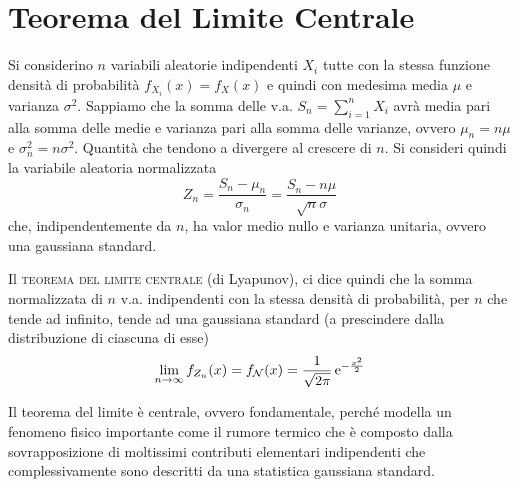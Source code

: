 \section{Teorema del Limite Centrale}
Si considerino $n$ variabili aleatorie indipendenti $X_i$ tutte con la stessa funzione densità di probabilità $f_{X_i}(x)=f_X(x)$ e quindi con medesima media $\mu$ e varianza $\sigma^2$. Sappiamo che la somma delle v.a. $S_n=\sum_{i=1}^{n}X_i$ avrà media pari alla somma delle medie e varianza pari alla somma delle varianze, ovvero $\mu_n=n\mu$ e $\sigma^2_n=n\sigma^2$. Quantità che tendono a divergere al crescere di $n$.
Si consideri quindi la variabile aleatoria normalizzata
\[
	Z_n=\frac{S_n-\mu_n}{\sigma_n}=\frac{S_n-n\mu}{\sqrt{n}\sigma}
\]
che, indipendentemente da $n$, ha valor medio nullo e varianza unitaria, ovvero una gaussiana standard.

Il \textsc{teorema del limite centrale} (di Lyapunov), ci dice quindi che la somma normalizzata di $n$ v.a. indipendenti con la stessa densità di probabilità, per $n$ che tende ad infinito, tende ad una gaussiana standard (a prescindere dalla distribuzione di ciascuna di esse)
\begin{equation}
	\lim\limits_{n\to\infty}f_{Z_n}(x)=f_\mathcal{N}(x)=\frac{1}{\sqrt{2\pi}}\operatorname{e}^{-\frac{x^2}{2}}
\end{equation}
\begin{nota}
	Il teorema del limite è centrale, ovvero fondamentale, perché modella un fenomeno fisico importante come il rumore termico che è composto dalla sovrapposizione di moltissimi contributi elementari indipendenti che complessivamente sono descritti da una statistica gaussiana standard.
\end{nota}
